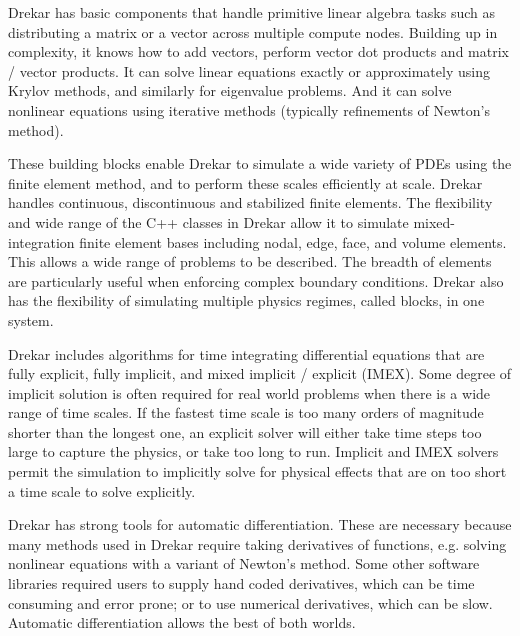 \documentclass[11pt]{article} %
\begin{document}
Drekar has basic components that handle primitive linear algebra tasks such as 
distributing a matrix or a vector across multiple compute nodes.
Building up in complexity, it knows how to add vectors,
perform vector dot products and matrix / vector products.
It can solve linear equations exactly or approximately using Krylov methods,
and similarly for eigenvalue problems.
And it can solve nonlinear equations using iterative methods
(typically refinements of Newton's method).

These building blocks enable Drekar to simulate a wide variety of PDEs
using the finite element method, and to perform these scales efficiently at scale.
Drekar handles continuous, discontinuous and stabilized finite elements.
The flexibility and wide range of the C++ classes in Drekar allow it to simulate
mixed-integration finite element bases including nodal, edge, face, and volume elements.
This allows a wide range of problems to be described.
The breadth of elements are particularly useful when enforcing complex boundary conditions.
Drekar also has the flexibility of simulating multiple physics regimes, called blocks, in one system.

Drekar includes algorithms for time integrating differential equations that are 
fully explicit, fully implicit, and mixed implicit / explicit (IMEX).  
Some degree of implicit solution is often required for real world problems
when there is a wide range of time scales.  If the fastest time scale
is too many orders of magnitude shorter than the longest one,
an explicit solver will either take time steps too large to capture the physics,
or take too long to run.  
Implicit and IMEX solvers permit the simulation to implicitly solve for physical
effects that are on too short a time scale to solve explicitly.

Drekar has strong tools for automatic differentiation.
These are necessary because many methods used in Drekar require
taking derivatives of functions, e.g. solving nonlinear equations with a variant of Newton's method.  
Some other software libraries required users to supply hand coded derivatives, 
which can be time consuming and error prone;
or to use numerical derivatives, which can be slow.
Automatic differentiation allows the best of both worlds.
\end{document}
